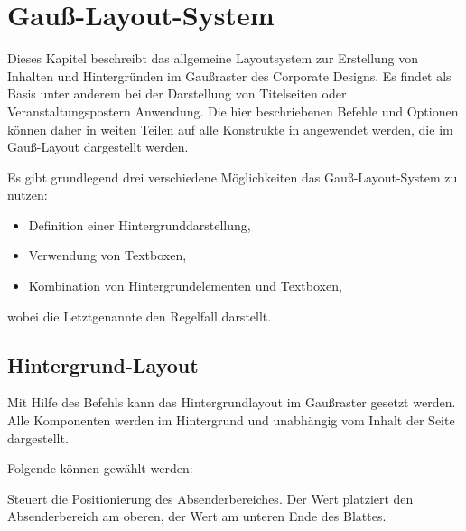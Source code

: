 \chapter{Gauß-Layout-System}\label{chap:gausspage}

Dieses Kapitel beschreibt das allgemeine Layoutsystem zur Erstellung von
Inhalten und Hintergründen im Gaußraster des Corporate Designs.
Es findet als Basis unter anderem bei der Darstellung von Titelseiten oder
Veranstaltungspostern Anwendung. Die hier beschriebenen Befehle und Optionen
können daher in weiten Teilen auf alle Konstrukte in \tubslatex angewendet
werden, die im Gauß-Layout dargestellt werden.

Es gibt grundlegend drei verschiedene Möglichkeiten das Gauß-Layout-System
zu nutzen:
\begin{itemize}
  \item Definition einer Hintergrunddarstellung,
  \item Verwendung von Textboxen,
  \item Kombination von Hintergrundelementen und Textboxen,
\end{itemize}
wobei die Letztgenannte den Regelfall darstellt.

\section{Hintergrund-Layout}\label{sec:gausspage:bglayout}

\begin{Declaration}
\end{Declaration}

Mit Hilfe des Befehls  kann das Hintergrundlayout im Gaußraster gesetzt werden.
Alle Komponenten werden im Hintergrund und unabhängig vom Inhalt der Seite
dargestellt.

Folgende  können gewählt werden:

\begin{Declaration}
\end{Declaration}

Steuert die Positionierung des Absenderbereiches.
Der Wert  platziert den Absenderbereich am oberen,
der Wert  am unteren Ende des Blattes.

\begin{Declaration}
\end{Declaration}

